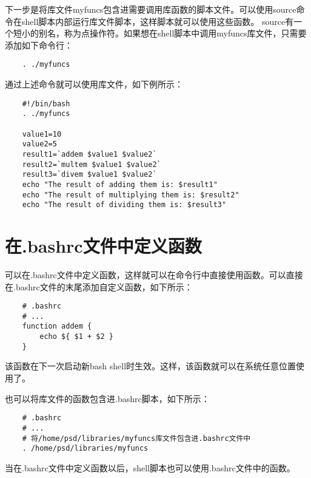 \documentclass[a4paper,left=2.5cm,right=2.5cm,11pt]{article}
\begin{document}
	下一步是将库文件myfuncs包含进需要调用库函数的脚本文件。可以使用source命令在shell脚本内部运行库文件脚本，这样脚本就可以使用这些函数。
	source有一个短小的别名，称为点操作符。如果想在shell脚本中调用myfuncs库文件，只需要添加如下命令行：
	\begin{lstlisting}
	. ./myfuncs
	\end{lstlisting}

	通过上述命令就可以使用库文件，如下例所示：
	\begin{lstlisting}
	#!/bin/bash
	. ./myfuncs

	value1=10
	value2=5
	result1=`addem $value1 $value2`
	result2=`multem $value1 $value2`
	result3=`divem $value1 $value2`
	echo "The result of adding them is: $result1"
	echo "The result of multiplying them is: $result2"
	echo "The result of dividing them is: $result3"
	\end{lstlisting}

\section{在.bashrc文件中定义函数}
	可以在.bashrc文件中定义函数，这样就可以在命令行中直接使用函数。可以直接在.bashrc文件的末尾添加自定义函数，如下所示：
	\begin{lstlisting}
	# .bashrc
	# ...
	function addem {
		echo ${ $1 + $2 }
	}
	\end{lstlisting}

	该函数在下一次启动新bash shell时生效。这样，该函数就可以在系统任意位置使用了。\par

	也可以将库文件的函数包含进.bashrc脚本，如下所示：
	\begin{lstlisting}
	# .bashrc
	# ...
	# 将/home/psd/libraries/myfuncs库文件包含进.bashrc文件中
	. /home/psd/libraries/myfuncs
	\end{lstlisting}
	
	当在.bashrc文件中定义函数以后，shell脚本也可以使用.bashrc文件中的函数。
\end{document}
